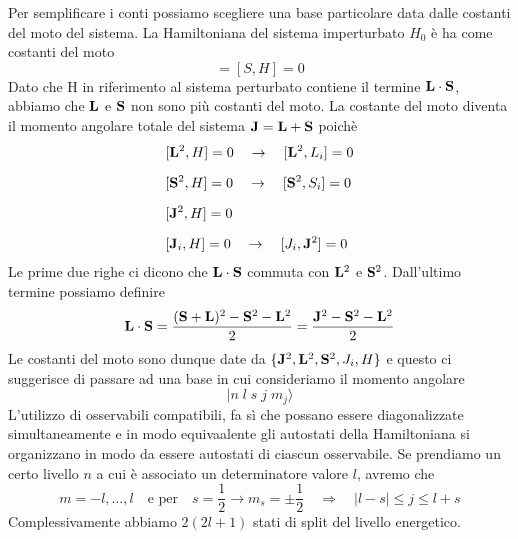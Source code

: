Per semplificare i conti possiamo scegliere una base particolare data dalle costanti del moto del sistema. La Hamiltoniana del sistema imperturbato $H_0$ \`e ha come costanti del moto 
\begin{equation*}
	[L,H] = [S,H] = 0
\end{equation*}
Dato che H in riferimento al sistema perturbato contiene il termine $\bold{L} \cdot \bold{S}$, abbiamo che $\bold{L}$ e $\bold{S}$ non sono pi\`u costanti del moto.  La costante del moto diventa il momento angolare totale del sistema $\bold{J} = \bold{L}+ \bold{S}$ poich\`e
\begin{align*}
	& [\bold{L}^2,H] = 0 \quad \rightarrow \quad [\bold{L}^2,L_i] = 0 \\[0.2cm]
	& [\bold{S}^2,H] = 0 \quad \rightarrow \quad [\bold{S}^2,S_i] = 0 \\[0.2cm]
	& [\bold{J}^2,H] = 0 \\[0.2cm]
	& [\bold{J}_i,H] = 0 \quad \rightarrow \quad [J_i,\bold{J}^2] = 0  
\end{align*}
Le prime due righe ci dicono che $\bold{L} \cdot \bold{S}$ commuta con $\bold{L}^2$ e $\bold{S}^2$. Dall'ultimo termine possiamo definire 
\begin{equation*}
	\bold{L} \cdot \bold{S} = \frac{(\bold{S} + \bold{L})^2- \bold{S}^2 - \bold{L}^2}{2} = \frac{\bold{J}^2 - \bold{S}^2-\bold{L}^2}{2}
\end{equation*}
Le costanti del moto sono dunque date da $\{\bold{J}^2,\bold{L}^2,\bold{S}^2,J_i,H\}$ e questo ci suggerisce di passare ad una base in cui consideriamo il momento angolare 
\begin{equation*}
	|n \; l \; s \; j \; m_j \rangle 
\end{equation*}
L'utilizzo di osservabili compatibili, fa s\`i che possano essere diagonalizzate simultaneamente e in modo equivaalente gli autostati della Hamiltoniana si organizzano in modo da essere autostati di ciascun osservabile.
Se prendiamo un certo livello $n$ a cui \`e associato un determinatore valore $l$, avremo che 
\begin{equation*}
	m = -l,\ldots,l \quad \text{e per} \quad s = \frac{1}{2} \rightarrow m_s = \pm \frac{1}{2} \quad \Rightarrow \quad |l-s| \leq j \leq l+s 
\end{equation*}
Complessivamente abbiamo $2(2l+1)$ stati di split del livello energetico.
\vspace{1cm}
\begin{center}
\end{center}

